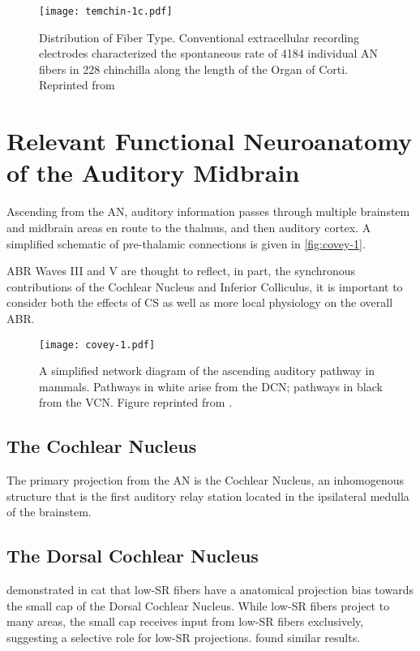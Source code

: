 \begin{figure}[htbp]
	\centering
	\texttt{[image: temchin-1c.pdf]}
	\caption[Distribution of Fiber Type]{Distribution of Fiber Type. Conventional extracellular recording electrodes characterized the spontaneous rate of 4184 individual AN fibers in 228 chinchilla along the length of the Organ of Corti. Reprinted from \cite{Temchin2008Threshold}}
	\label{fig:temchin-1}
\end{figure}

\section{Relevant Functional Neuroanatomy of the Auditory Midbrain} %
\label{sec:relevant_functional_neuroanatomy_of_the_auditory_midbrain}
Ascending from the AN, auditory information passes through multiple brainstem and midbrain areas en route to the thalmus, and then auditory cortex.  A simplified schematic of pre-thalamic connections is given in \autoref{fig:covey-1}. 

ABR Waves III and V are thought to reflect, in part, the synchronous contributions of the Cochlear Nucleus and Inferior Colliculus, it is important to consider both the effects of CS as well as more local physiology on the overall ABR.

\begin{figure}[htbp]
	\centering
	\texttt{[image: covey-1.pdf]}
	\caption[Ascending Auditory Pathway]{A simplified network diagram of the ascending auditory pathway in mammals.  Pathways in white arise from the DCN; pathways in black from the VCN.  Figure reprinted from \cite{Covey2008Inputs}.}
	\label{fig:covey-1}
\end{figure}

\subsection{The Cochlear Nucleus} %
\label{sub:the_cochlear_nucleus}
The primary projection from the AN is the Cochlear Nucleus, an inhomogenous structure that is the first auditory relay station located in the ipsilateral medulla of the brainstem.  
\subsection{The Dorsal Cochlear Nucleus} %
\label{sub:the_dorsal_cochlear_nucleus}
\cite{Ryugo2008Projections} demonstrated in cat that low-SR fibers have a anatomical projection bias towards the small cap of the Dorsal Cochlear Nucleus.  While low-SR fibers project to many areas, the small cap receives input from low-SR fibers exclusively, suggesting a selective role for low-SR projections. \cite{Liberman1993Central} found similar results. 

